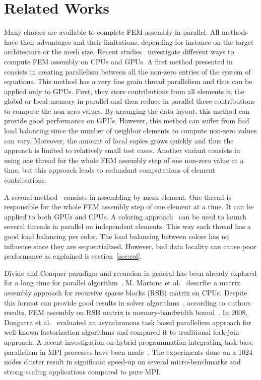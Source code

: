 \documentclass{IOS-Book-Article}
\begin{document}
\section{Related Works}
Many choices are available to complete FEM assembly in parallel.
All methods have their advantages and their limitations, depending for instance on the target architecture or the mesh size.
Recent studies~\cite{cecka2011assembly,CPUGPUasm} investigate different ways to compute FEM assembly on CPUs and GPUs.
A first method presented in~\cite{cecka2011assembly} consists in creating parallelism between all the non-zero entries of the system of equations.
This method has a very fine grain thread parallelism and thus can be applied only to GPUs.
First, they store contributions from all elements in the global or local memory in parallel and then reduce in parallel these contributions to compute the non-zero values.
By arranging the data layout, this method can provide good performance on GPUs.
However, this method can suffer from bad load balancing since the number of neighbor elements to compute non-zero values can vary.
Moreover, the amount of local copies grows quickly and thus the approach is limited to relatively small test cases.
Another variant consists in using one thread for the whole FEM assembly step of one non-zero value at a time, but this approach leads to redundant computations of element contributions.

A second method~\cite{cecka2011assembly} consists in assembling by mesh element. One thread is responsible for the whole FEM assembly step of one element at a time.
It can be applied to both GPUs and CPUs.
A coloring approach~\cite{CUDAfe,CPUfe} can be used to launch several threads in parallel on independent elements.
This way each thread has a good load balancing per color. The load balancing between colors has no influence since they are sequentialized.
However, bad data locality can cause poor performance as explained is section~\ref{sec:col}.

Divide and Conquer paradigm and recursion in general has been already explored for a long time for parallel algorithm~\cite{div}.
M. Martone et al.~\cite{RSBasm} describe a matrix assembly approach for recursive sparse blocks (RSB) matrix on CPUs.
Despite this format can provide good results in solver algorithms~\cite{RSBsolver}, according to authors results, FEM assembly on RSB matrix is memory-bandwidth bound~\cite{RSBasm}.
In 2008, Dongarra et al.~\cite{Dongarra} evaluated an asynchronous task based parallelism approach for well-known factorization algorithms and compared it to traditional fork-join approach.
A recent investigation on hybrid programmation integrating task base parallelism in MPI processes have been made~\cite{MPIhybid}.
The experiments done on a 1024 nodes cluster result in significant speed-up on several micro-benchmarks and strong scaling applications compared to pure MPI.
\end{document}
